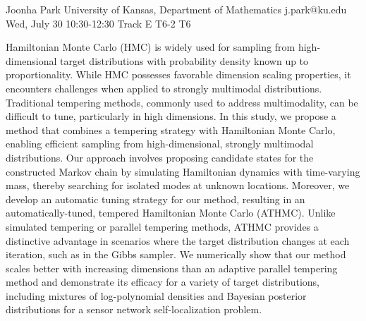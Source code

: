 \begin{talk}
  {Joonha Park}%
  {University of Kansas, Department of Mathematics}%
  {j.park@ku.edu}%
  {}%
  {}%
  {}%
  {Wed, July 30 10:30-12:30 Track E}%
  {T6-2}%
  {T6}%

Hamiltonian Monte Carlo (HMC) is widely used for sampling from high-dimensional target distributions with probability density known up to proportionality. While HMC possesses favorable dimension scaling properties, it encounters challenges when applied to strongly multimodal distributions. Traditional tempering methods, commonly used to address multimodality, can be diﬃcult to tune, particularly in high dimensions. In this study, we propose a method that combines a tempering strategy with Hamiltonian Monte Carlo, enabling eﬃcient sampling from high-dimensional, strongly multimodal distributions. Our approach involves proposing candidate states for the constructed Markov chain by simulating Hamiltonian dynamics with time-varying mass, thereby searching for isolated modes at unknown locations. Moreover, we develop an automatic tuning strategy for our method, resulting in an automatically-tuned, tempered Hamiltonian Monte Carlo (ATHMC). Unlike simulated tempering or parallel tempering methods, ATHMC provides a distinctive advantage in scenarios where the target distribution changes at each iteration, such as in the Gibbs sampler. We numerically show that our method scales better with increasing dimensions than an adaptive parallel tempering method and demonstrate its eﬃcacy for a variety of target distributions, including mixtures of log-polynomial densities and Bayesian posterior distributions for a sensor network self-localization problem.
			
\end{talk}
